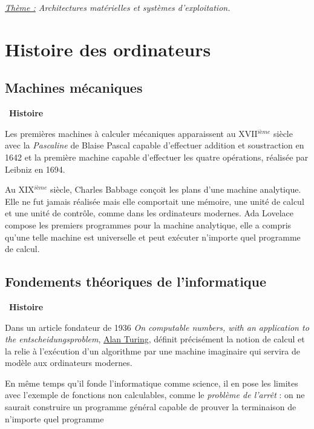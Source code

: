 \documentclass[a4paper, french, 11pt]{article}  %
\newcounter{thme}
\newcounter{alg}
\newcounter{prog}
\newcounter{histo}
\newenvironment{histoire}[1]
{\par \medskip   \addtocounter{histo}{1} \noindent  
 \begin {bclogo}[couleur = blue!10 , arrondi =0.1,logo=\bchorloge, marge=4] {~\textbf{Histoire} \textbf{\thehisto} {\itshape #1} }  \par}
{
\end{bclogo}
 \par \bigskip }
\begin{document}
\setlength{\parindent}{0cm}

{\itshape \uline{Thème :} Architectures matérielles et systèmes d'exploitation. }

\section{Histoire des ordinateurs}

\subsection{Machines mécaniques}


\begin{histoire}{}
Les premières machines à calculer mécaniques apparaissent au XVII$^{ième}$ siècle avec la \textit{Pascaline} de Blaise Pascal capable d'effectuer addition et soustraction en 1642 et la première machine capable d'effectuer les quatre opérations, réalisée par  Leibniz en 1694.

Au XIX$^{ième}$ siècle, Charles Babbage conçoit les plans d'une machine analytique. Elle ne fut jamais réalisée mais elle comportait une mémoire, une unité de calcul et une unité de contrôle, comme dans les ordinateurs modernes. Ada Lovelace compose les premiers programmes pour la machine analytique, elle a compris qu'une telle machine est universelle et peut exécuter n'importe quel programme de calcul.

\end{histoire}

\subsection{Fondements théoriques de l'informatique}

\begin{histoire}{}
Dans un article fondateur de 1936 \textit{On computable numbers, with an application to the entscheidungsproblem}, \href{https://interstices.info/alan-turingproblème de l'arrêt-du-calculable-a-lindecidable/}{Alan Turing}, définit précisément la notion de calcul et la relie à l'exécution d'un algorithme par une machine imaginaire qui servira de modèle aux ordinateurs modernes. 

En même temps qu'il fonde l'informatique comme science, il  en pose les limites avec l'exemple de fonctions non calculables, comme le \textit{problème de l'arrêt} : on ne saurait construire un programme général capable de prouver la terminaison de n’importe quel programme

\end{histoire}
\end{document}
